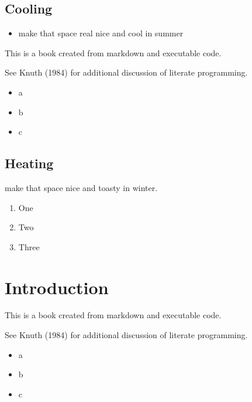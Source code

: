 \documentclass[
  letterpaper,
  DIV=11,
  numbers=noendperiod]{scrreprt}
\providecommand{\tightlist}{%
  \setlength{\itemsep}{0pt}\setlength{\parskip}{0pt}}\usepackage{longtable,booktabs,array}
\begin{document}
\newpage
\toc
\newpage

\section{Cooling}\label{cooling}

\begin{itemize}
\tightlist
\item
  make that space real nice and cool in summer
\end{itemize}

This is a book created from markdown and executable code.

See Knuth (1984) for additional discussion of literate programming.

\begin{itemize}
\tightlist
\item
  a
\item
  b
\item
  c
\end{itemize}

\section{Heating}\label{heating}

make that space nice and toasty in winter.

\begin{enumerate}
\def\labelenumi{\arabic{enumi}.}
\tightlist
\item
  One
\item
  Two
\item
  Three
\end{enumerate}


\chapter{Introduction}\label{introduction}

This is a book created from markdown and executable code.

See Knuth (1984) for additional discussion of literate programming.

\begin{itemize}
\tightlist
\item
  a
\item
  b
\item
  c
\end{itemize}

\end{document}
